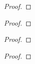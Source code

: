 \begin{solution}
    \begin{proof}
        
    \end{proof}
\end{solution}
\begin{exercise}{70}
    
\end{exercise}
\begin{solution}
    \begin{proof}
        
    \end{proof}
\end{solution}
\begin{exercise}{71}
    
\end{exercise}
\begin{solution}
    \begin{proof}
        
    \end{proof}
\end{solution}
\begin{exercise}{72}
    
\end{exercise}
\begin{solution}
    \begin{proof}
        
    \end{proof}
\end{solution}